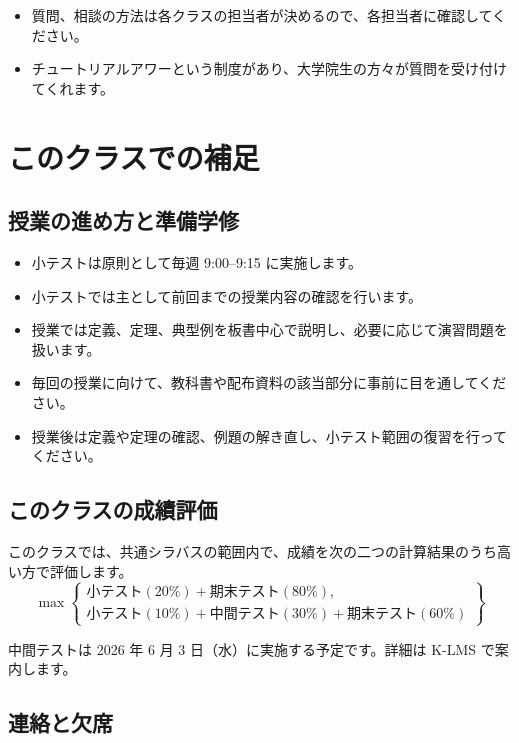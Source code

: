 \documentclass[a4paper,12pt]{jsarticle}
\begin{document}
\begin{itemize}[leftmargin=2em]
\item 質問、相談の方法は各クラスの担当者が決めるので、各担当者に確認してください。
\item チュートリアルアワーという制度があり、大学院生の方々が質問を受け付けてくれます。
\end{itemize}

\section*{このクラスでの補足}

\subsection*{授業の進め方と準備学修}

\begin{itemize}[leftmargin=2em]
\item 小テストは原則として毎週 9:00--9:15 に実施します。
\item 小テストでは主として前回までの授業内容の確認を行います。
\item 授業では定義、定理、典型例を板書中心で説明し、必要に応じて演習問題を扱います。
\item 毎回の授業に向けて、教科書や配布資料の該当部分に事前に目を通してください。
\item 授業後は定義や定理の確認、例題の解き直し、小テスト範囲の復習を行ってください。
\end{itemize}

\subsection*{このクラスの成績評価}

このクラスでは、共通シラバスの範囲内で、成績を次の二つの計算結果のうち高い方で評価します。
\[
\max\left\{
\begin{array}{l}
\text{小テスト}(20\%) + \text{期末テスト}(80\%), \\[0.3em]
\text{小テスト}(10\%) + \text{中間テスト}(30\%) + \text{期末テスト}(60\%)
\end{array}
\right\}
\]

中間テストは 2026 年 6 月 3 日（水）に実施する予定です。詳細は K-LMS で案内します。

\subsection*{連絡と欠席}
\end{document}
